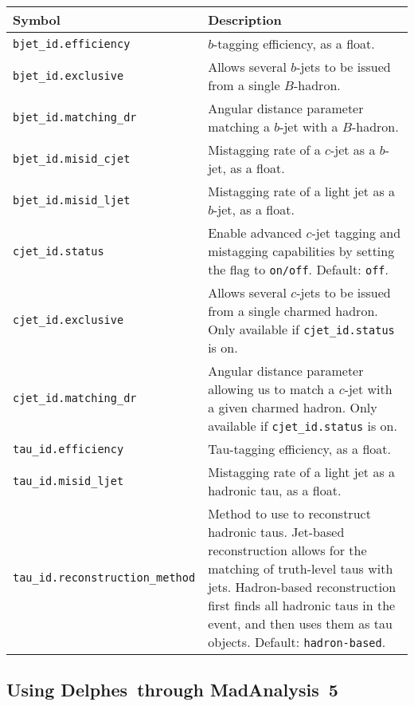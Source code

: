 \documentclass[a4paper]{article}
\newcommand{\MAnorm}{{MadAnalysis}~5}
\newcommand{\DELnorm}{{Delphes}}
\begin{document}
\begin{center}\begin{tabular}{l p{8.4cm}}
\hline
Symbol& Description\\
\hline
\color{ao} \verb?bjet_id.efficiency? & $b$-tagging efficiency, as a float.\\
\color{ao} \verb?bjet_id.exclusive? & Allows several $b$-jets to be issued from a single
  $B$-hadron.\\
\color{ao} \verb?bjet_id.matching_dr? & Angular distance parameter matching a $b$-jet
  with a $B$-hadron.\\
\color{ao} \verb?bjet_id.misid_cjet? & Mistagging rate of a $c$-jet as a $b$-jet, as
  a float.\\
\color{ao} \verb?bjet_id.misid_ljet? & Mistagging rate of a light jet as a $b$-jet,
  as a float.\\
  
\color{ao} \verb?cjet_id.status? & Enable advanced $c$-jet tagging and mistagging capabilities by setting the flag to \verb?on/off?. Default: \verb?off?.\\
\color{ao} \verb?cjet_id.exclusive? & Allows several $c$-jets to be issued from a single charmed hadron. Only available if \verb?cjet_id.status? is on.\\
\color{ao} \verb?cjet_id.matching_dr? & Angular distance parameter allowing us to match a $c$-jet with a given charmed hadron. Only available if \verb?cjet_id.status? is on.\\

\color{ao} \verb?tau_id.efficiency? & Tau-tagging efficiency, as a float.\\
\color{ao} \verb?tau_id.misid_ljet? &  Mistagging rate of a light jet as a hadronic tau,
   as a float.\\
   \color{ao} \verb?tau_id.reconstruction_method? & Method to use to reconstruct hadronic taus. Jet-based reconstruction allows for the matching of truth-level taus with jets. Hadron-based reconstruction first finds all hadronic taus in the event, and then uses them as tau objects. Default: \verb?hadron-based?.\\
\hline
\end{tabular}
\end{center}

\vspace{2cm}

\begin{shaded}
\section{\Large Using \DELnorm\ through \MAnorm}
\end{shaded}
\end{document}
